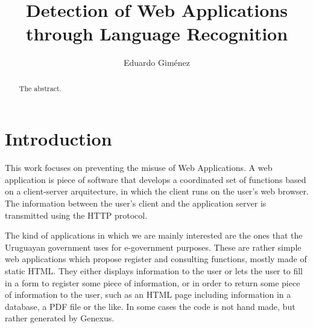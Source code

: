 \documentclass[runningheads,a4paper]{llncs}
\begin{document}


\title{Detection of Web Applications through Language Recognition}

\author{Eduardo Giménez}

%
\iffalse
\author{Firstname Lastname\inst{1} \and Firstname Lastname\inst{2} }

\institute{
Insitute 1\\
\email{...}\and
Insitute 2\\
\email{...}
}
\fi
			
\maketitle

\begin{abstract}
The abstract.
\end{abstract}


\section{Introduction}\label{sec:intro}

This work focuses on preventing the misuse of Web Applications. A web application is piece of software that develops a coordinated set of functions based on a client-server arquitecture, in which the client runs on the user’s web browser. The information between the user’s client and the application server is transmitted using the HTTP protocol.

The kind of applications in which we are mainly interested are the ones that the Uruguayan government uses for e-government purposes. These are rather simple web applications which propose register and consulting functions, mostly made of static HTML. They either displays information to the user or lets the user to fill in a form to register some piece of information, or in order to return some piece of information to the user, such as an HTML page including information in a database, a PDF file or the like. In some cases the code is not hand made, but rather generated by Genexus.
\end{document}
